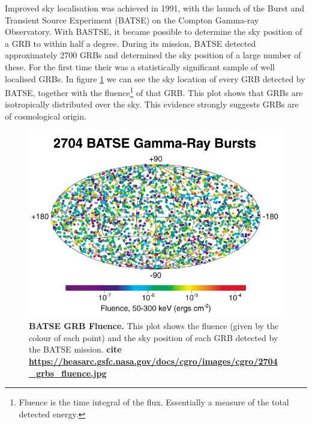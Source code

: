 \documentclass[11pt]{cuthesis}
\begin{document}
Improved sky localisation was achieved in 1991, with the launch of the Burst and Transient Source Experiment (BATSE) on the Compton Gamma-ray Observatory. With BASTSE, it became possible to determine the sky position of a GRB to within half a degree. During its mission, BATSE detected approximately 2700 GRBs and determined the sky position of a large number of these. For the first time their was a statistically significant sample of well localised GRBs. In figure \ref{fig:batse grb fluence} we can see the sky location of every GRB detected by BATSE, together with the fluence\footnote{Fluence is the time integral of the flux. Essentially a measure of the total detected energy.} of that GRB. This plot shows that GRBs are isotropically distributed over the sky. This evidence strongly suggests GRBs are of cosmological origin. 


\begin{figure} %
\begin{center}
\includegraphics[width=0.8\linewidth]{batse_grbs_fluence.jpg}
\end{center}
\caption{\textbf{BATSE GRB Fluence.} This plot shows the fluence (given by the colour of each point) and the sky position of each GRB detected by the BATSE mission. \textbf{cite \url{https://heasarc.gsfc.nasa.gov/docs/cgro/images/cgro/2704_grbs_fluence.jpg}}}
\label{fig:batse grb fluence}
\end{figure}
\end{document}
